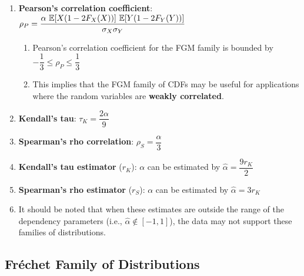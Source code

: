 \begin{enumerate}
    \item \textbf{Pearson’s correlation coefficient}:
    $
        \rho_P = \dfrac{\alpha\ \mbbE[X (1 - 2F_X (X))]\ \mbbE[Y (1 - 2F_Y (Y ))] }{\sigma_X \sigma_Y}
    $
    \hfill \cite{statistics/book/Statistics-for-Data-Scientists/Maurits-Kaptein}
    \begin{enumerate}
        \item Pearson’s correlation coefficient for the FGM family is bounded by $-\dfrac{1}{3} \leq \rho_P \leq \dfrac{1}{3}$
        \hfill \cite{statistics/book/Statistics-for-Data-Scientists/Maurits-Kaptein}

        \item This implies that the FGM family of CDFs may be useful for applications where the random variables are \textbf{weakly correlated}.
        \hfill \cite{statistics/book/Statistics-for-Data-Scientists/Maurits-Kaptein}
    \end{enumerate}

    \item \textbf{Kendall’s tau}: $\tau_K = \dfrac{2\alpha}{9}$
    \hfill \cite{statistics/book/Statistics-for-Data-Scientists/Maurits-Kaptein}

    \item \textbf{Spearman’s rho correlation}: $\rho_S = \dfrac{\alpha}{3}$
    \hfill \cite{statistics/book/Statistics-for-Data-Scientists/Maurits-Kaptein}

    \item \textbf{Kendall’s tau estimator} ($r_K$):
    $\alpha$ can be estimated by $\hat{\alpha} = \dfrac{9r_K}{2}$
    \hfill \cite{statistics/book/Statistics-for-Data-Scientists/Maurits-Kaptein}

    \item \textbf{Spearman’s rho estimator} ($r_S$):
    $\alpha$ can be estimated by $\hat{\alpha} = 3r_K$
    \hfill \cite{statistics/book/Statistics-for-Data-Scientists/Maurits-Kaptein}
    
    \item[] It should be noted that when these estimates are outside the range of the dependency parameters (i.e., $\hat{\alpha} \notin [-1, 1]$), the data may not support these families of distributions.
    \hfill \cite{statistics/book/Statistics-for-Data-Scientists/Maurits-Kaptein}
\end{enumerate}



\subsection{Fréchet Family of Distributions}

